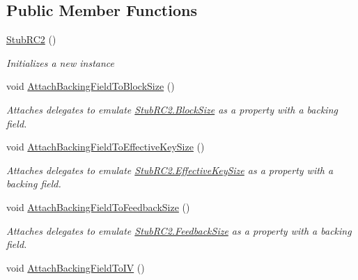 \subsection*{Public Member Functions}
\begin{DoxyCompactItemize}
\item 
\hyperlink{class_system_1_1_security_1_1_cryptography_1_1_fakes_1_1_stub_r_c2_a1c985bf251a2b7009efc8a74a0c71ab8}{Stub\-R\-C2} ()
\begin{DoxyCompactList}\small\item\em Initializes a new instance\end{DoxyCompactList}\item 
void \hyperlink{class_system_1_1_security_1_1_cryptography_1_1_fakes_1_1_stub_r_c2_a1e411db4280b995b44f384c084fb7265}{Attach\-Backing\-Field\-To\-Block\-Size} ()
\begin{DoxyCompactList}\small\item\em Attaches delegates to emulate \hyperlink{class_system_1_1_security_1_1_cryptography_1_1_fakes_1_1_stub_r_c2_a4fd8ed4d8b70e5cd2741aed9266850e5}{Stub\-R\-C2.\-Block\-Size} as a property with a backing field.\end{DoxyCompactList}\item 
void \hyperlink{class_system_1_1_security_1_1_cryptography_1_1_fakes_1_1_stub_r_c2_a0bd308bf8166967949a87c42b8fd7960}{Attach\-Backing\-Field\-To\-Effective\-Key\-Size} ()
\begin{DoxyCompactList}\small\item\em Attaches delegates to emulate \hyperlink{class_system_1_1_security_1_1_cryptography_1_1_fakes_1_1_stub_r_c2_ac87eb803b124be8f2e957aaceb348853}{Stub\-R\-C2.\-Effective\-Key\-Size} as a property with a backing field.\end{DoxyCompactList}\item 
void \hyperlink{class_system_1_1_security_1_1_cryptography_1_1_fakes_1_1_stub_r_c2_adb974103ca11c6c87db048c4f27e574b}{Attach\-Backing\-Field\-To\-Feedback\-Size} ()
\begin{DoxyCompactList}\small\item\em Attaches delegates to emulate \hyperlink{class_system_1_1_security_1_1_cryptography_1_1_fakes_1_1_stub_r_c2_a078f083118fd172baee225e251d4769c}{Stub\-R\-C2.\-Feedback\-Size} as a property with a backing field.\end{DoxyCompactList}\item 
void \hyperlink{class_system_1_1_security_1_1_cryptography_1_1_fakes_1_1_stub_r_c2_ab702dac93b324a3bf14d4ec140a1109e}{Attach\-Backing\-Field\-To\-I\-V} ()

\end{DoxyCompactItemize}
